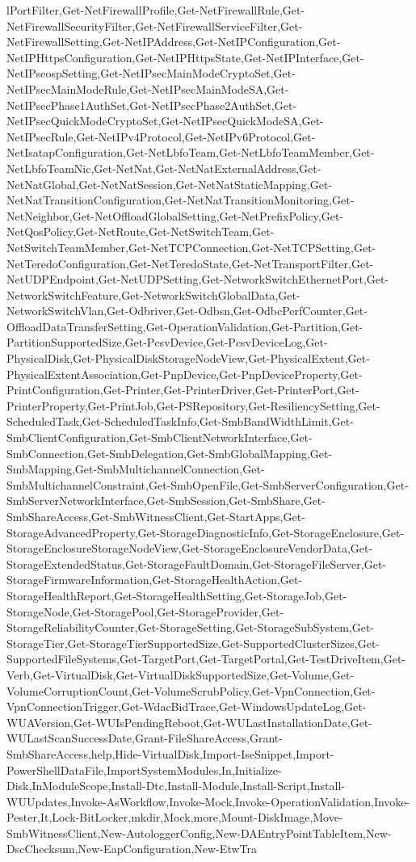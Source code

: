 {lPortFilter,Get-NetFirewallProfile,Get-NetFirewallRule,Get-NetFirewallSecurityFilter,Get-NetFirewallServiceFilter,Get-NetFirewallSetting,Get-NetIPAddress,Get-NetIPConfiguration,Get-NetIPHttpsConfiguration,Get-NetIPHttpsState,Get-NetIPInterface,Get-NetIPseospSetting,Get-NetIPsecMainModeCryptoSet,Get-NetIPsecMainModeRule,Get-NetIPsecMainModeSA,Get-NetIPsecPhase1AuthSet,Get-NetIPsecPhase2AuthSet,Get-NetIPsecQuickModeCryptoSet,Get-NetIPsecQuickModeSA,Get-NetIPsecRule,Get-NetIPv4Protocol,Get-NetIPv6Protocol,Get-NetIsatapConfiguration,Get-NetLbfoTeam,Get-NetLbfoTeamMember,Get-NetLbfoTeamNic,Get-NetNat,Get-NetNatExternalAddress,Get-NetNatGlobal,Get-NetNatSession,Get-NetNatStaticMapping,Get-NetNatTransitionConfiguration,Get-NetNatTransitionMonitoring,Get-NetNeighbor,Get-NetOffloadGlobalSetting,Get-NetPrefixPolicy,Get-NetQosPolicy,Get-NetRoute,Get-NetSwitchTeam,Get-NetSwitchTeamMember,Get-NetTCPConnection,Get-NetTCPSetting,Get-NetTeredoConfiguration,Get-NetTeredoState,Get-NetTransportFilter,Get-NetUDPEndpoint,Get-NetUDPSetting,Get-NetworkSwitchEthernetPort,Get-NetworkSwitchFeature,Get-NetworkSwitchGlobalData,Get-NetworkSwitchVlan,Get-Odbriver,Get-Odbsn,Get-OdbcPerfCounter,Get-OffloadDataTransferSetting,Get-OperationValidation,Get-Partition,Get-PartitionSupportedSize,Get-PcsvDevice,Get-PcsvDeviceLog,Get-PhysicalDisk,Get-PhysicalDiskStorageNodeView,Get-PhysicalExtent,Get-PhysicalExtentAssociation,Get-PnpDevice,Get-PnpDeviceProperty,Get-PrintConfiguration,Get-Printer,Get-PrinterDriver,Get-PrinterPort,Get-PrinterProperty,Get-PrintJob,Get-PSRepository,Get-ResiliencySetting,Get-ScheduledTask,Get-ScheduledTaskInfo,Get-SmbBandWidthLimit,Get-SmbClientConfiguration,Get-SmbClientNetworkInterface,Get-SmbConnection,Get-SmbDelegation,Get-SmbGlobalMapping,Get-SmbMapping,Get-SmbMultichannelConnection,Get-SmbMultichannelConstraint,Get-SmbOpenFile,Get-SmbServerConfiguration,Get-SmbServerNetworkInterface,Get-SmbSession,Get-SmbShare,Get-SmbShareAccess,Get-SmbWitnessClient,Get-StartApps,Get-StorageAdvancedProperty,Get-StorageDiagnosticInfo,Get-StorageEnclosure,Get-StorageEnclosureStorageNodeView,Get-StorageEnclosureVendorData,Get-StorageExtendedStatus,Get-StorageFaultDomain,Get-StorageFileServer,Get-StorageFirmwareInformation,Get-StorageHealthAction,Get-StorageHealthReport,Get-StorageHealthSetting,Get-StorageJob,Get-StorageNode,Get-StoragePool,Get-StorageProvider,Get-StorageReliabilityCounter,Get-StorageSetting,Get-StorageSubSystem,Get-StorageTier,Get-StorageTierSupportedSize,Get-SupportedClusterSizes,Get-SupportedFileSystems,Get-TargetPort,Get-TargetPortal,Get-TestDriveItem,Get-Verb,Get-VirtualDisk,Get-VirtualDiskSupportedSize,Get-Volume,Get-VolumeCorruptionCount,Get-VolumeScrubPolicy,Get-VpnConnection,Get-VpnConnectionTrigger,Get-WdacBidTrace,Get-WindowsUpdateLog,Get-WUAVersion,Get-WUIsPendingReboot,Get-WULastInstallationDate,Get-WULastScanSuccessDate,Grant-FileShareAccess,Grant-SmbShareAccess,help,Hide-VirtualDisk,Import-IseSnippet,Import-PowerShellDataFile,ImportSystemModules,In,Initialize-Disk,InModuleScope,Install-Dtc,Install-Module,Install-Script,Install-WUUpdates,Invoke-AsWorkflow,Invoke-Mock,Invoke-OperationValidation,Invoke-Pester,It,Lock-BitLocker,mkdir,Mock,more,Mount-DiskImage,Move-SmbWitnessClient,New-AutologgerConfig,New-DAEntryPointTableItem,New-DscChecksum,New-EapConfiguration,New-EtwTra}
